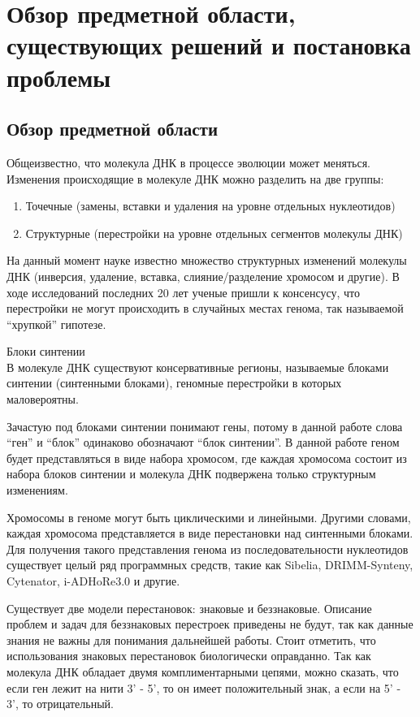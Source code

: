 \chapter{Обзор предметной области, существующих решений и постановка проблемы}

\section{Обзор предметной области}
Общеизвестно, что молекула ДНК в процессе эволюции может меняться.
Изменения происходящие в молекуле ДНК можно разделить на две группы:
\begin{enumerate}
  \item Точечные (замены, вставки и удаления на уровне отдельных нуклеотидов)
  \item Структурные (перестройки на уровне отдельных сегментов молекулы ДНК)
\end{enumerate}
На данный момент науке известно множество структурных изменений молекулы ДНК (инверсия, удаление, вставка, слияние/разделение хромосом и другие).
В ходе исследований последних 20 лет ученые пришли к консенсусу, что перестройки не могут происходить в случайных местах генома,
так называемой ``хрупкой'' гипотезе.

\begin{define}{Блоки синтении} \\
  В молекуле ДНК существуют консервативные регионы, называемые блоками синтении (синтенными блоками),
  геномные перестройки в которых маловероятны.
\end{define}

Зачастую под блоками синтении понимают гены, потому в данной работе слова ``ген'' и ``блок'' одинаково обозначают ``блок синтении''.
В данной работе геном будет представляться в виде набора хромосом,
где каждая хромосома состоит из набора блоков синтении и молекула ДНК подвержена только структурным изменениям.

Хромосомы в геноме могут быть циклическими и линейными.
Другими словами, каждая хромосома представляется в виде перестановки над синтенными блоками.
Для получения такого представления генома из последовательности нуклеотидов существует целый ряд программных средств,
такие как Sibelia, DRIMM-Synteny, Cytenator, i-ADHoRe3.0 и другие.

Существует две модели перестановок: знаковые и беззнаковые.
Описание проблем и задач для беззнаковых перестроек приведены не будут, так как данные знания не важны для понимания дальнейшей работы.
Стоит отметить, что использования знаковых перестановок биологически оправданно.
Так как молекула ДНК обладает двумя комплиментарными цепями, можно сказать,
что если ген лежит на нити 3' - 5', то он имеет положительный знак, а если на 5' - 3', то отрицательный.

